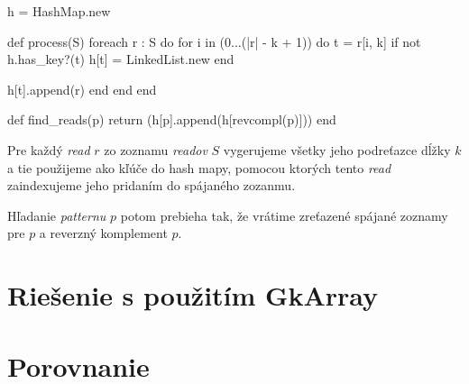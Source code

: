 \begin{pseudocode}[label=lst:hash_algorithm,caption={Algoritmus na riešenie
problému zarovnania readov pomocou hash mapy}]
h = HashMap.new

def process(S)
  foreach r : S do
    for i in (0...(|r| - k + 1)) do
      t = r[i, k]
      if not h.has_key?(t)
        h[t] = LinkedList.new
      end
        
      h[t].append(r)
    end 
  end
end

def find_reads(p)
  return (h[p].append(h[revcompl(p)]))
end
\end{pseudocode}

Pre každý \emph{read} $r$ zo zoznamu \emph{readov} $S$ vygerujeme všetky jeho
podreťazce dĺžky $k$ a tie použijeme ako kľúče do hash mapy, pomocou ktorých
tento \emph{read} zaindexujeme jeho pridaním do spájaného zozanmu.

Hľadanie \emph{patternu} $p$ potom prebieha tak, že vrátime zreťazené spájané
zoznamy pre $p$ a reverzný komplement $p$.

\section{Riešenie s použitím GkArray}

\section{Porovnanie}